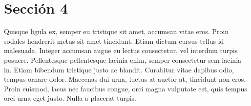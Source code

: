 	\section{Sección 4}
	Quisque ligula ex, semper eu tristique sit amet, accumsan vitae eros. Proin sodales hendrerit metus sit amet tincidunt. Etiam dictum cursus tellus id malesuada. Integer accumsan augue eu lectus consectetur, vel interdum turpis posuere. Pellentesque pellentesque lacinia enim, semper consectetur sem lacinia in. Etiam bibendum tristique justo ac blandit. Curabitur vitae dapibus odio, tempus ornare dolor. Maecenas dui urna, luctus at auctor at, tincidunt non eros. Proin euismod, lacus nec faucibus congue, orci magna vulputate est, quis tempus orci urna eget justo. Nulla a placerat turpis.
